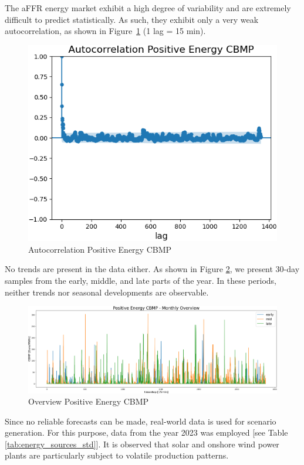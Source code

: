 The aFFR energy market exhibit a high degree of variability and are extremely difficult to predict statistically.
As such, they exhibit only a very weak autocorrelation, as shown in Figure~\ref{fig:Autocorrelation Positive Energy Price} (1 lag = 15 min).

\begin{figure}[!h]
	\centering
	\includegraphics[width=0.6\linewidth]{pictures/posEngCBMP_autoCorr.png}
	\caption{Autocorrelation Positive Energy CBMP}
	\label{fig:Autocorrelation Positive Energy Price}
\end{figure}

No trends are present in the data either.
As shown in Figure \ref{fig:posEngOverview}, we present 30-day samples from the early, middle, and late parts of the year.
In these periods, neither trends nor seasonal developments are observable.

\begin{figure}[!h]
	\includegraphics[width=1\linewidth]{pictures/posEngCBMP.png}
	\caption{Overview Positive Energy CBMP}
	\label{fig:posEngOverview}
\end{figure}

Since no reliable forecasts can be made, real-world data is used for scenario generation.
For this purpose, data from the year 2023 was employed [see Table \ref{tab:energy_sources_std}].
It is observed that solar and onshore wind power plants are particularly subject to volatile production patterns.

